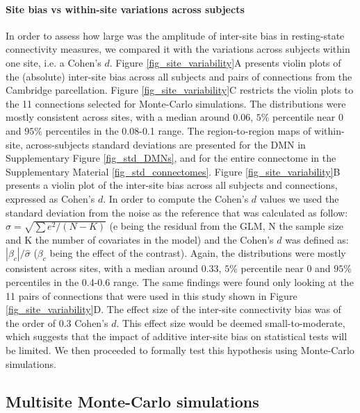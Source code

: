 \documentclass[authoryear]{elsarticle}
\begin{document}
\paragraph{Site bias vs within-site variations across subjects} In order to assess how large was the amplitude of inter-site bias in resting-state connectivity measures, we compared it with the variations across subjects within one site, i.e. a Cohen's $d$. Figure \ref{fig_site_variability}A presents violin plots of the (absolute) inter-site bias across all subjects and pairs of connections from the Cambridge parcellation. Figure \ref{fig_site_variability}C restricts the violin plots to the 11 connections selected for Monte-Carlo simulations. The distributions were mostly consistent across sites, with a median around 0.06, $5\%$ percentile near 0 and $95\%$ percentiles in the 0.08-0.1 range. The region-to-region maps of within-site, across-subjects standard deviations are presented for the DMN in Supplementary Figure \ref{fig_std_DMNs}, and for the entire connectome in the Supplementary Material \ref{fig_std_connectomes}. Figure \ref{fig_site_variability}B presents a violin plot of the inter-site bias across all subjects and connections, expressed as Cohen's $d$. In order to compute the Cohen's $d$ values we used the standard deviation from the noise as the reference that was calculated as follow: $\hat{\sigma}=\sqrt{\sum{e^{2}}/(N-K)}$ (e being the residual from the GLM, N the sample size and K the number of covariates in the model) and the Cohen's $d$ was defined as: $|\beta_c|/\hat{\sigma}$ ($\beta_c$ being the effect of the contrast). Again, the distributions were mostly consistent across sites, with a median around 0.33, $5\%$ percentile near 0 and $95\%$ percentiles in the 0.4-0.6 range. The same findings were found only looking at the 11 pairs of connections that were used in this study shown in Figure \ref{fig_site_variability}D. The effect size of the inter-site connectivity bias was of the order of 0.3 Cohen's $d$. This effect size would be deemed small-to-moderate, which suggests that the impact of additive inter-site bias on statistical tests will be limited. We then proceeded to formally test this hypothesis using Monte-Carlo simulations.

\subsection{Multisite Monte-Carlo simulations}
\end{document}
